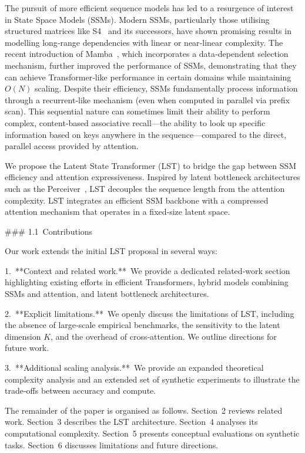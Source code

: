 \documentclass[10pt,twocolumn,letterpaper]{article}
\begin{document}
The pursuit of more efficient sequence models has led to a resurgence of interest in State Space Models (SSMs).  Modern SSMs, particularly those utilising structured matrices like S4 \cite{gu2021efficiently} and its successors, have shown promising results in modelling long‑range dependencies with linear or near‑linear complexity.  The recent introduction of Mamba \cite{gu2023mamba}, which incorporates a data‑dependent selection mechanism, further improved the performance of SSMs, demonstrating that they can achieve Transformer‑like performance in certain domains while maintaining $O(N)$ scaling.  Despite their efficiency, SSMs fundamentally process information through a recurrent‑like mechanism (even when computed in parallel via prefix scan).  This sequential nature can sometimes limit their ability to perform complex, content‑based associative recall—the ability to look up specific information based on keys anywhere in the sequence—compared to the direct, parallel access provided by attention.

We propose the Latent State Transformer (LST) to bridge the gap between SSM efficiency and attention expressiveness.  Inspired by latent bottleneck architectures such as the Perceiver \cite{jaegle2021perceiver}, LST decouples the sequence length from the attention complexity.  LST integrates an efficient SSM backbone with a compressed attention mechanism that operates in a fixed‑size latent space.

### 1.1 Contributions

Our work extends the initial LST proposal in several ways:

1. **Context and related work.** We provide a dedicated related‑work section highlighting existing efforts in efficient Transformers, hybrid models combining SSMs and attention, and latent bottleneck architectures.

2. **Explicit limitations.** We openly discuss the limitations of LST, including the absence of large‑scale empirical benchmarks, the sensitivity to the latent dimension $K$, and the overhead of cross‑attention.  We outline directions for future work.

3. **Additional scaling analysis.** We provide an expanded theoretical complexity analysis and an extended set of synthetic experiments to illustrate the trade‑offs between accuracy and compute.

The remainder of the paper is organised as follows.  Section 2 reviews related work.  Section 3 describes the LST architecture.  Section 4 analyses its computational complexity.  Section 5 presents conceptual evaluations on synthetic tasks.  Section 6 discusses limitations and future directions.
\end{document}
